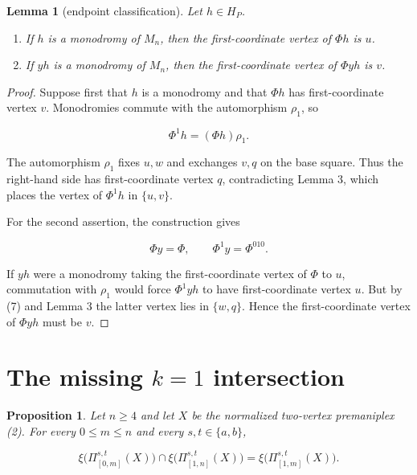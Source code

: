 \documentclass[11pt]{article}
\newtheorem{lemma}[theorem]{Lemma}
\newtheorem{proposition}[theorem]{Proposition}
\begin{document}
\begin{lemma}[endpoint classification]

Let $h\in H_P$.

\begin{enumerate}
\item If $h$ is a monodromy of $M_n$, then the first-coordinate vertex of $\Phi h$ is $u$.
\item If $yh$ is a monodromy of $M_n$, then the first-coordinate vertex of $\Phi yh$ is $v$.
\end{enumerate}

\end{lemma}

\begin{proof}

Suppose first that $h$ is a monodromy and that $\Phi h$ has first-coordinate vertex $v$.
Monodromies commute with the automorphism $\rho_1$, so

\[
\Phi^1h=(\Phi h)\rho_1.
\]

The automorphism $\rho_1$ fixes $u,w$ and exchanges $v,q$ on the base square. Thus the right-hand
side has first-coordinate vertex $q$, contradicting Lemma 3, which places the vertex of $\Phi^1h$
in $\{u,v\}$.

For the second assertion, the construction gives

\[
\Phi y=\Phi,\qquad \Phi^1y=\Phi^{010}.
\tag{7}
\]

If $yh$ were a monodromy taking the first-coordinate vertex of $\Phi$ to $u$, commutation with
$\rho_1$ would force $\Phi^1yh$ to have first-coordinate vertex $u$. But by (7) and Lemma 3 the
latter vertex lies in $\{w,q\}$. Hence the first-coordinate vertex of $\Phi yh$ must be $v$.

\end{proof}


\section{The missing \texorpdfstring{$k=1$}{k=1} intersection}

\begin{proposition}

Let $n\geq4$ and let $X$ be the normalized two-vertex premaniplex (2). For every
$0\leq m\leq n$ and every $s,t\in\{a,b\}$,

\[
\xi\bigl(\Pi_{[0,m]}^{s,t}(X)\bigr)
\cap
\xi\bigl(\Pi_{[1,n]}^{s,t}(X)\bigr)
=
\xi\bigl(\Pi_{[1,m]}^{s,t}(X)\bigr).
\tag{8}
\]

\end{proposition}
\end{document}
